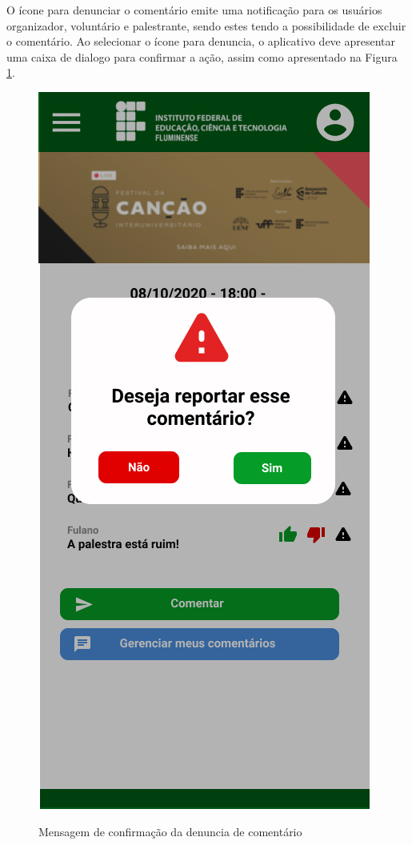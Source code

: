 O ícone para denunciar o comentário emite uma notificação para os usuários organizador, voluntário e palestrante, sendo estes tendo a possibilidade de excluir o comentário. Ao selecionar o ícone para denuncia, o aplicativo deve apresentar uma caixa de dialogo para confirmar a ação, assim como apresentado na Figura \ref{fig:audiencia11}.

\begin{figure}[H]
    \centering
    \caption{Mensagem de confirmação da denuncia de comentário}
    \includegraphics[scale=0.44]{figuras/Audiencia/11-Denunciar.jpg}
    \label{fig:audiencia11}
\end{figure}

